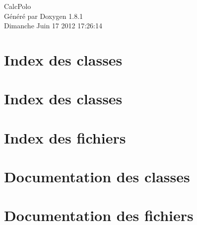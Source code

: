 \documentclass{book}
\begin{document}
\hypersetup{pageanchor=false,citecolor=blue}
\begin{titlepage}
\vspace*{7cm}
\begin{center}
{\Large Calc\-Polo }\\
\vspace*{1cm}
{\large Généré par Doxygen 1.8.1}\\
\vspace*{0.5cm}
{\small Dimanche Juin 17 2012 17:26:14}\\
\end{center}
\end{titlepage}
\clearemptydoublepage
{}
\tableofcontents
\clearemptydoublepage
{}
\hypersetup{pageanchor=true,citecolor=blue}
\chapter{Index des classes}

\chapter{Index des classes}

\chapter{Index des fichiers}

\chapter{Documentation des classes}















\chapter{Documentation des fichiers}















\printindex
\end{document}
